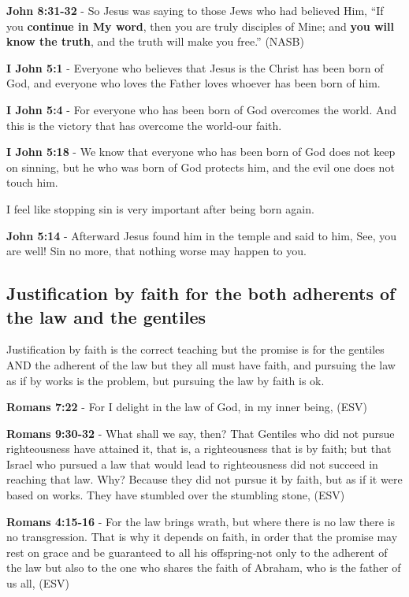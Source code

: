 \documentclass[11pt]{article}
\begin{document}
\textbf{John 8:31-32} - So Jesus was saying to those Jews who had believed Him, “If you \textbf{continue in My word}, then you are truly disciples of Mine; and \textbf{you will know the truth}, and the truth will make you free.” (NASB)

\textbf{I John 5:1} - Everyone who believes that Jesus is the Christ has been born of God, and everyone who loves the Father loves whoever has been born of him.

\textbf{I John 5:4} - For everyone who has been born of God overcomes the world. And this is the victory that has overcome the world-our faith.

\textbf{I John 5:18} - We know that everyone who has been born of God does not keep on sinning, but he who was born of God protects him, and the evil one does not touch him.

I feel like stopping sin is very important after being born again.

\textbf{John 5:14} - Afterward Jesus found him in the temple and said to him, See, you are well! Sin no more, that nothing worse may happen to you.

\subsection{Justification by faith for the both adherents of the law and the gentiles}
\label{sec:org588cbfd}
Justification by faith is the correct teaching but the promise is for the gentiles AND the adherent of the law but they all must have faith, and pursuing the law as if by works is the problem, but pursuing the law by faith is ok.

\textbf{Romans 7:22} - For I delight in the law of God, in my inner being, (ESV)

\textbf{Romans 9:30-32} - What shall we say, then? That Gentiles who did not pursue righteousness have attained it, that is, a righteousness that is by faith; but that Israel who pursued a law that would lead to righteousness did not succeed in reaching that law. Why? Because they did not pursue it by faith, but as if it were based on works. They have stumbled over the stumbling stone, (ESV)

\textbf{Romans 4:15-16} - For the law brings wrath, but where there is no law there is no transgression. That is why it depends on faith, in order that the promise may rest on grace and be guaranteed to all his offspring-not only to the adherent of the law but also to the one who shares the faith of Abraham, who is the father of us all, (ESV)
\end{document}
